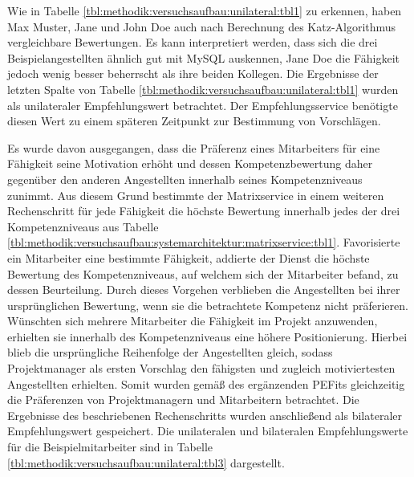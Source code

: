 Wie in Tabelle \ref{tbl:methodik:versuchsaufbau:unilateral:tbl1} zu erkennen, haben Max Muster, Jane und John Doe auch nach Berechnung des Katz-Algorithmus vergleichbare Bewertungen. Es kann interpretiert werden, dass sich die drei Beispielangestellten ähnlich gut mit MySQL auskennen, Jane Doe die Fähigkeit jedoch wenig besser beherrscht als ihre beiden Kollegen. Die Ergebnisse der letzten Spalte von Tabelle \ref{tbl:methodik:versuchsaufbau:unilateral:tbl1} wurden als unilateraler Empfehlungswert betrachtet. Der Empfehlungsservice benötigte diesen Wert zu einem späteren Zeitpunkt zur Bestimmung von Vorschlägen.

Es wurde davon ausgegangen, dass die Präferenz eines Mitarbeiters für eine Fähigkeit seine Motivation erhöht und dessen Kompetenzbewertung daher gegenüber den anderen Angestellten innerhalb seines Kompetenzniveaus zunimmt. Aus diesem Grund bestimmte der Matrixservice in einem weiteren Rechenschritt für jede Fähigkeit die höchste Bewertung innerhalb jedes der drei Kompetenzniveaus aus Tabelle \ref{tbl:methodik:versuchsaufbau:systemarchitektur:matrixservice:tbl1}. Favorisierte ein Mitarbeiter eine bestimmte Fähigkeit, addierte der Dienst die höchste Bewertung des Kompetenzniveaus, auf welchem sich der Mitarbeiter befand, zu dessen Beurteilung. Durch dieses Vorgehen verblieben die Angestellten bei ihrer ursprünglichen Bewertung, wenn sie die betrachtete Kompetenz nicht präferieren. Wünschten sich mehrere Mitarbeiter die Fähigkeit im Projekt anzuwenden, erhielten sie innerhalb des Kompetenzniveaus eine höhere Positionierung. Hierbei blieb die ursprüngliche Reihenfolge der Angestellten gleich, sodass Projektmanager als ersten Vorschlag den fähigsten und zugleich motiviertesten Angestellten erhielten. Somit wurden gemäß des ergänzenden \acp{PEFit} gleichzeitig die Präferenzen von Projektmanagern und Mitarbeitern betrachtet. Die Ergebnisse des beschriebenen Rechenschritts wurden anschließend als bilateraler Empfehlungswert gespeichert. Die unilateralen und bilateralen Empfehlungswerte für die Beispielmitarbeiter sind in Tabelle \ref{tbl:methodik:versuchsaufbau:unilateral:tbl3} dargestellt.

